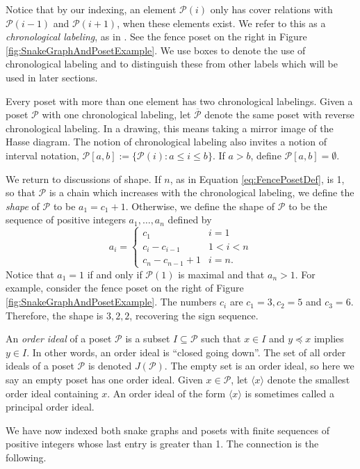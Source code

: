 \documentclass[12pt, letterpaper,table]{amsart}
\theoremstyle{remark}
\newcommand{\calP}{\mathcal{P}}
\begin{document}
Notice that by our indexing, an element $\calP(i)$ only has cover relations with $\calP(i-1)$ and $\calP(i+1)$, when these elements exist. We refer to this as a \emph{chronological labeling}, as in \cite{banaian2024skein}. See the fence poset on the right in Figure \ref{fig:SnakeGraphAndPosetExample}. We use boxes to denote the use of chronological labeling and to distinguish these from other labels which will be used in later sections.

Every poset with more than one element has two chronological labelings. Given a poset $\calP$ with one chronological labeling, let $\overline{\calP}$ denote the same poset with reverse chronological labeling. In a drawing, this means taking a mirror image of the Hasse diagram. The notion of chronological labeling  also invites a notion of interval notation, $\calP[a,b] := \{\calP(i): a \leq i \leq b\}$. If $a > b$, define $\calP[a,b] = \emptyset$.

We return to discussions of shape. If $n$, as in Equation \ref{eq:FencePosetDef}, is 1, so that  $\calP$ is a chain which increases with the chronological labeling, we define the \emph{shape} of $\calP$ to be $a_1 = c_1+1$. Otherwise, we define the shape of $\calP$ to be the sequence of positive integers $a_1,\ldots,a_n$ defined by \[
a_i = \begin{cases} c_1 & i = 1 \\ c_i - c_{i-1} & 1 < i < n \\ c_n - c_{n-1} + 1 & i = n.
\end{cases}
\]
Notice that $a_1 = 1$ if and only if $\calP(1)$ is maximal and that $a_n > 1$. 
For example, consider the fence poset on the right of Figure \ref{fig:SnakeGraphAndPosetExample}. The numbers $c_i$ are $c_1 = 3, c_2 = 5$ and $c_3 = 6$. Therefore, the shape is $3,2,2$, recovering the sign sequence.

An \emph{order ideal} of a poset $\calP$ is a subset $I \subseteq \calP$ such that $x \in I$ and $y \preceq x$ implies $y \in I$. In other words, an order ideal is ``closed going down''. The set of all order ideals of a poset $\calP$ is denoted $J(\calP)$. The empty set is an order ideal, so here we say an empty poset has one order ideal. Given $x \in \calP$, let $\langle x \rangle$ denote the smallest order ideal containing $x$. An order ideal of the form $\langle x \rangle$ is sometimes called a principal order ideal. 

We have now indexed both snake graphs and posets with finite sequences of positive integers whose last entry is greater than 1. The connection is the following.
\end{document}
